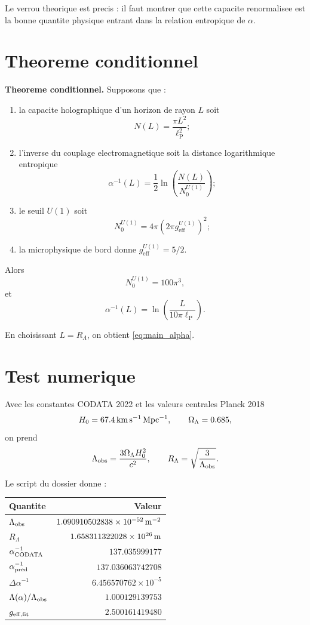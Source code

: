 \documentclass[11pt,a4paper]{article}
\newcommand{\lP}{\ell_{\mathrm P}}
\newcommand{\RL}{R_{\Lambda}}
\newcommand{\geff}{g_{\mathrm{eff}}^{U(1)}}
\begin{document}
Le verrou theorique est precis : il faut montrer que cette capacite
renormalisee est la bonne quantite physique entrant dans la relation
entropique de \(\alpha\).

\section{Theoreme conditionnel}

\textbf{Theoreme conditionnel.} Supposons que :
\begin{enumerate}
\item la capacite holographique d'un horizon de rayon \(L\) soit
\[
N(L)=\frac{\pi L^2}{\lP^2};
\]
\item l'inverse du couplage electromagnetique soit la distance logarithmique
entropique
\[
\alpha^{-1}(L)=\frac12\ln\left(\frac{N(L)}{N_0^{U(1)}}\right);
\]
\item le seuil \(U(1)\) soit
\[
N_0^{U(1)}=4\pi\left(2\pi\geff\right)^2;
\]
\item la microphysique de bord donne \(\geff=5/2\).
\end{enumerate}

Alors
\begin{equation}
N_0^{U(1)}=100\pi^3,
\end{equation}
et
\begin{equation}
\boxed{\alpha^{-1}(L)=\ln\left(\frac{L}{10\pi\lP}\right).}
\end{equation}

En choisissant \(L=\RL\), on obtient \eqref{eq:main_alpha}.

\section{Test numerique}

Avec les constantes CODATA 2022 et les valeurs centrales Planck 2018
\[
H_0=67.4\,{\rm km\,s^{-1}\,Mpc^{-1}},
\qquad
\Omega_\Lambda=0.685,
\]
on prend
\begin{equation}
\Lambda_{\rm obs}=\frac{3\Omega_\Lambda H_0^2}{c^2},
\qquad
\RL=\sqrt{\frac{3}{\Lambda_{\rm obs}}}.
\end{equation}

Le script du dossier donne :
\begin{center}
\begin{tabular}{lr}
\toprule
Quantite & Valeur \\
\midrule
\(\Lambda_{\rm obs}\) & \(1.090910502838\times10^{-52}\,{\rm m^{-2}}\)\\
\(\RL\) & \(1.658311322028\times10^{26}\,{\rm m}\)\\
\(\alpha^{-1}_{\rm CODATA}\) & \(137.035999177\)\\
\(\alpha^{-1}_{\rm pred}\) & \(137.036063742708\)\\
\(\Delta\alpha^{-1}\) & \(6.456570762\times10^{-5}\)\\
\(\Lambda(\alpha)/\Lambda_{\rm obs}\) & \(1.000129139753\)\\
\(g_{\rm eff,fit}\) & \(2.500161419480\)\\
\bottomrule
\end{tabular}
\end{center}
\end{document}

